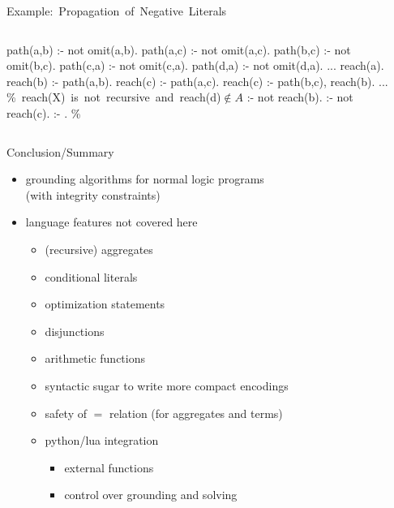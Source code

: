 \begin{frame}[fragile]{\mbox{Example: Propagation of Negative Literals}}
  \vspace{.1cm}
  \begin{columns}
    \begin{column}{0.45\textwidth}
    \begin{minipage}{.4\textwidth}
      \begin{semiverbatim}
path(a,b) :- not omit(a,b).
path(a,c) :- not omit(a,c).
path(b,c) :- not omit(b,c).
path(c,a) :- not omit(c,a).
path(d,a) :- not omit(d,a).
...
\alert{reach(a)}.
\alert{reach(b)} :- path(a,b).
\alert{reach(c)} :- path(a,c).
\alert{reach(c)} :- path(b,c), reach(b).
...
\mbox{{\color{comment}\% reach(X) is not recursive and reach(d)\({}\not\in{}A\)}}
:- not reach(b).
:- not reach(c).
:- . \color{comment}\% 
      \end{semiverbatim}
    \end{minipage}
    \end{column}
    \begin{column}[t]{0.45\textwidth}
      \centering
      \Graph[draw=none]
    \end{column}
  \end{columns}
\end{frame}

\begin{frame}{Conclusion/Summary}
  \vfill
  \begin{itemize}
    \item grounding algorithms for normal logic programs\\(with integrity constraints)
    \item language features not covered here
      \begin{itemize}
        \item (recursive) aggregates
        \item conditional literals
        \item optimization statements
        \item disjunctions
        \item arithmetic functions
        \item syntactic sugar to write more compact encodings
        \item safety of \(=\) relation (for aggregates and terms)
        \item python/lua integration
          \begin{itemize}
            \item external functions
            \item control over grounding and solving
          \end{itemize}
      \end{itemize}
  \end{itemize}
\end{frame}
%
